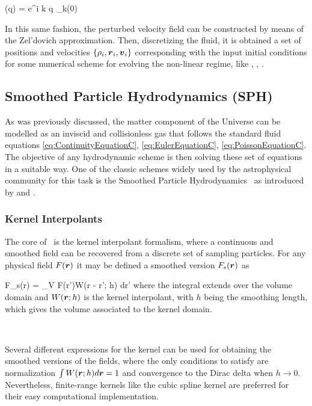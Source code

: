 \documentclass[a4,useAMS,usenatbib,usegraphicx,12pt]{article}
\begin{document}
{ \bds{\Psi}(\bds q) = \int {}e^{i \bds k \cdot \bds q}
\delta_{\bds k}(0) }

In this same fashion, the perturbed velocity field can be constructed by means
of the Zel'dovich approximation. Then, discretizing the fluid, it is obtained a 
set of positions and velocities $\{\rho_i,\boldsymbol{ r }_i, \boldsymbol{ v }_i\}$ corresponding 
with the input initial conditions for some numerical scheme for evolving the 
non-linear regime, like \SPH, \VPH, \AMR.


\subsection*{Smoothed Particle Hydrodynamics (SPH)}
As was previously discussed, the matter component of the Universe can be modelled
as an inviscid and collisionless gas that follows the standard fluid equations
\ref{eq:ContinuityEquationC}, \ref{eq:EulerEquationC}, \ref{eq:PoissonEquationC}.
The objective of any hydrodynamic scheme is then solving these set of equations
in a suitable way. One of the classic schemes widely used by the astrophysical 
community for this task is the Smoothed Particle Hydrodynamics \SPH\ as 
introduced by \citet{Lucy77} and \citet{Gingold77}.

\subsubsection*{Kernel Interpolants}

The core of \SPH\ is the kernel interpolant formalism, where a continuous and
smoothed field can be recovered from a discrete set of sampling particles. For
any physical field $F(\boldsymbol{ r })$ it may be defined a smoothed version $F_s(\boldsymbol{ r })$
as

{ F_s(\bds r) = \int_V \bds F(\bds r')W(\bds r - \bds r'; h) d\bds r' }
where the integral extends over the volume domain and $W(\boldsymbol{ r };h)$ is the 
kernel interpolant, with $h$ being the smoothing length, which gives the volume
associated to the kernel domain. 

\

Several different expressions for the kernel can be used for obtaining the 
smoothed versions of the fields, where the only conditions to satisfy are 
normalization $\int W(\boldsymbol{ r }; h)d\boldsymbol{ r }= 1$ and convergence to the Dirac delta 
when $h\rightarrow 0$. Nevertheless, finite-range kernels like the cubic spline 
kernel are preferred for their easy computational implementation.
\end{document}
